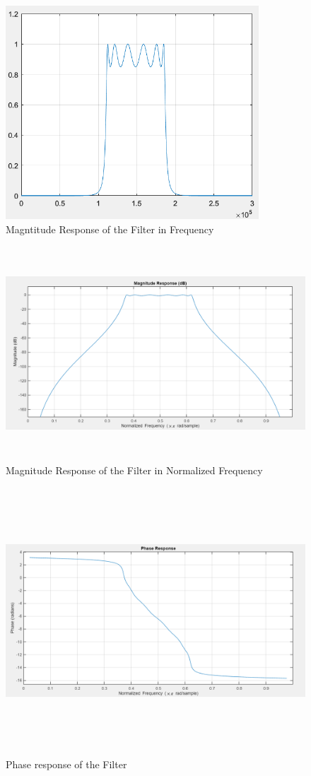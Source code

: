 \documentclass[12pt]{article}
\begin{document}
\begin{figure}[H]
    \centering
    \includegraphics[width =\textwidth, height=8cm]{magnitude_response_chebyschev.png}
    \caption{Magntitude Response of the Filter in Frequency}
\end{figure}

\begin{figure}[H]
    \centering
    \includegraphics[width =\textwidth, height=8cm]{magnitude_dB.png}
    \caption{Magnitude Response of the Filter in Normalized Frequency}
\end{figure}

\begin{figure}[H]
    \centering
    \includegraphics[width =\textwidth, height=10cm]{phase.png}
    \caption{Phase response of the Filter}
\end{figure}
\end{document}
